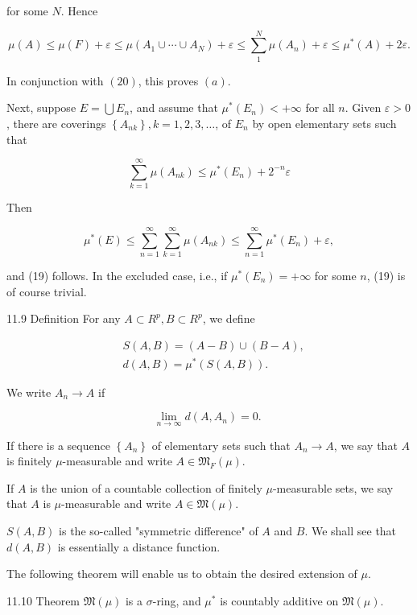 \documentclass[10pt]{article}
\begin{document}
for some $N$. Hence

$$
\mu(A) \leq \mu(F)+\varepsilon \leq \mu\left(A_{1} \cup \cdots \cup A_{N}\right)+\varepsilon \leq \sum_{1}^{N} \mu\left(A_{n}\right)+\varepsilon \leq \mu^{*}(A)+2 \varepsilon .
$$

In conjunction with $(20)$, this proves $(a)$.

Next, suppose $E=\bigcup E_{n}$, and assume that $\mu^{*}\left(E_{n}\right)<+\infty$ for all $n$. Given $\varepsilon>0$, there are coverings $\left\{A_{n k}\right\}, k=1,2,3, \ldots$, of $E_{n}$ by open elementary sets such that

$$
\sum_{k=1}^{\infty} \mu\left(A_{n k}\right) \leq \mu^{*}\left(E_{n}\right)+2^{-n} \varepsilon
$$

Then

$$
\mu^{*}(E) \leq \sum_{n=1}^{\infty} \sum_{k=1}^{\infty} \mu\left(A_{n k}\right) \leq \sum_{n=1}^{\infty} \mu^{*}\left(E_{n}\right)+\varepsilon,
$$

and (19) follows. In the excluded case, i.e., if $\mu^{*}\left(E_{n}\right)=+\infty$ for some $n$, (19) is of course trivial.

11.9 Definition For any $A \subset R^{p}, B \subset R^{p}$, we define

$$
\begin{aligned}
& S(A, B)=(A-B) \cup(B-A), \\
& d(A, B)=\mu^{*}(S(A, B)) .
\end{aligned}
$$

We write $A_{n} \rightarrow A$ if

$$
\lim _{n \rightarrow \infty} d\left(A, A_{n}\right)=0 \text {. }
$$

If there is a sequence $\left\{A_{n}\right\}$ of elementary sets such that $A_{n} \rightarrow A$, we say that $A$ is finitely $\mu$-measurable and write $A \in \mathfrak{M}_{F}(\mu)$.

If $A$ is the union of a countable collection of finitely $\mu$-measurable sets, we say that $A$ is $\mu$-measurable and write $A \in \mathfrak{M}(\mu)$.

$S(A, B)$ is the so-called "symmetric difference" of $A$ and $B$. We shall see that $d(A, B)$ is essentially a distance function.

The following theorem will enable us to obtain the desired extension of $\mu$.

11.10 Theorem $\mathfrak{M}(\mu)$ is a $\sigma$-ring, and $\mu^{*}$ is countably additive on $\mathfrak{M}(\mu)$.
\end{document}
